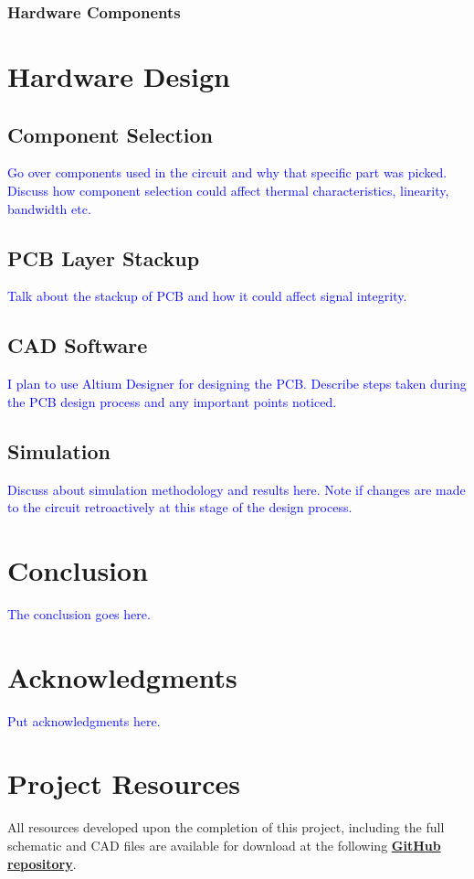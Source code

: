 \documentclass[10pt]{article}
\begin{document}
\begin{multicols}{2}
                \subsubsection{Hardware Components}
            

        \section{Hardware Design}
            \subsection{Component Selection}
                \textcolor{blue}{Go over components used in the circuit and why that specific part was picked. Discuss how component selection could affect thermal characteristics, linearity, bandwidth etc.}
                
            \subsection{PCB Layer Stackup}
                \textcolor{blue}{Talk about the stackup of PCB and how it could affect signal integrity.}
                
            \subsection{CAD Software}
                \textcolor{blue}{I plan to use Altium Designer for designing the PCB. Describe steps taken during the PCB design process and any important points noticed.}

            \subsection{Simulation}
                \textcolor{blue}{Discuss about simulation methodology and results here. Note if changes are made to the circuit retroactively at this stage of the design process.}
        
        \section{Conclusion}
            \textcolor{blue}{The conclusion goes here.}

        \section*{Acknowledgments}
            \textcolor{blue}{Put acknowledgments here. }

        \section*{Project Resources}
            All resources developed upon the completion of this project, including the full schematic and CAD files are available for download at the following \textbf{\textcolor{blue}{\href{https://github.com/ShaunG-RU/DRC-Project}{GitHub repository}}}.
        

    \end{multicols}

    \printbibliography
\end{document}
